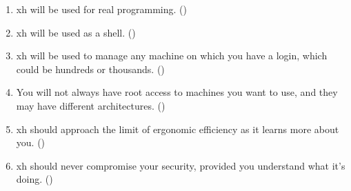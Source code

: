 \documentclass{report}
\makeatletter
\newcommand*{\Label}[2]{%
  \@bsphack
  \begingroup
    \label{#1-original}%
    \def\@currentlabel{#2 [\ref{#1-original}]}%
    \label{#1}%
  \endgroup
  \@esphack
}
\makeatother
\begin{document}
\begin{enumerate}
\item{}\Label{i:real-programming}{realprog}
  xh will be used for real programming.
(\initial)
\item{}\Label{i:shell}{shell}
  xh will be used as a shell.
(\initial)
\item{}\Label{i:distributed-computation}{distributed}
  xh will be used to manage any machine on which you have a login, which
  could be hundreds or thousands.
(\initial)
\item{}\Label{i:no-root-access}{noroot}
  You will not always have root access to machines you want to use, and
  they may have different architectures.
(\initial)
\item{}\Label{i:ergonomic-limit}{ergonomic}
  xh should approach the limit of ergonomic efficiency as it learns more
  about you.
(\initial)
\item{}\Label{i:security}{security}
  xh should never compromise your security, provided you understand what
  it's doing.
(\initial)


\end{enumerate}
\end{document}

